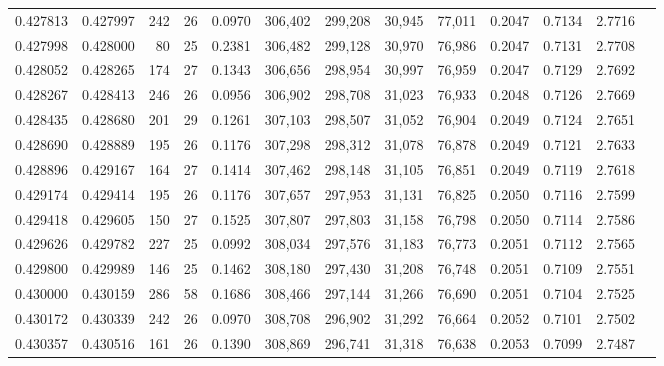 \begin{tabular}{rrrrrrrrrrrrr}
0.427813 & 0.427997 &    242 &    26 &                                     0.0970 & 306,402 & 299,208 &  30,945 &  77,011 & 0.2047 & 0.7134 & 2.7716 \\
0.427998 & 0.428000 &     80 &    25 &                                     0.2381 & 306,482 & 299,128 &  30,970 &  76,986 & 0.2047 & 0.7131 & 2.7708 \\
0.428052 & 0.428265 &    174 &    27 &                                     0.1343 & 306,656 & 298,954 &  30,997 &  76,959 & 0.2047 & 0.7129 & 2.7692 \\
0.428267 & 0.428413 &    246 &    26 &                                     0.0956 & 306,902 & 298,708 &  31,023 &  76,933 & 0.2048 & 0.7126 & 2.7669 \\
0.428435 & 0.428680 &    201 &    29 &                                     0.1261 & 307,103 & 298,507 &  31,052 &  76,904 & 0.2049 & 0.7124 & 2.7651 \\
0.428690 & 0.428889 &    195 &    26 &                                     0.1176 & 307,298 & 298,312 &  31,078 &  76,878 & 0.2049 & 0.7121 & 2.7633 \\
0.428896 & 0.429167 &    164 &    27 &                                     0.1414 & 307,462 & 298,148 &  31,105 &  76,851 & 0.2049 & 0.7119 & 2.7618 \\
0.429174 & 0.429414 &    195 &    26 &                                     0.1176 & 307,657 & 297,953 &  31,131 &  76,825 & 0.2050 & 0.7116 & 2.7599 \\
0.429418 & 0.429605 &    150 &    27 &                                     0.1525 & 307,807 & 297,803 &  31,158 &  76,798 & 0.2050 & 0.7114 & 2.7586 \\
0.429626 & 0.429782 &    227 &    25 &                                     0.0992 & 308,034 & 297,576 &  31,183 &  76,773 & 0.2051 & 0.7112 & 2.7565 \\
0.429800 & 0.429989 &    146 &    25 &                                     0.1462 & 308,180 & 297,430 &  31,208 &  76,748 & 0.2051 & 0.7109 & 2.7551 \\
0.430000 & 0.430159 &    286 &    58 &                                     0.1686 & 308,466 & 297,144 &  31,266 &  76,690 & 0.2051 & 0.7104 & 2.7525 \\
0.430172 & 0.430339 &    242 &    26 &                                     0.0970 & 308,708 & 296,902 &  31,292 &  76,664 & 0.2052 & 0.7101 & 2.7502 \\
0.430357 & 0.430516 &    161 &    26 &                                     0.1390 & 308,869 & 296,741 &  31,318 &  76,638 & 0.2053 & 0.7099 & 2.7487 \\

\end{tabular}
